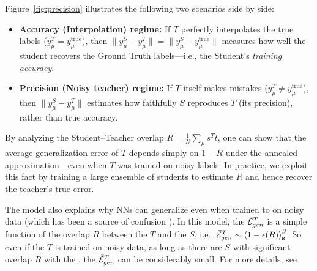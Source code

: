 

Figure~\ref{fig:precision} illustrates the following two scenarios side by side:
\begin{itemize}
  \item \textbf{Accuracy (Interpolation) regime:}
    If $T$ perfectly interpolates the true labels ($y^T_\mu = y^\text{true}_\mu$), then
    \( \|y^S_\mu - y^T_\mu\| = \|y^S_\mu - y^\text{true}_\mu\| \)
    measures how well the student recovers the Ground Truth labels—i.e., the Student's \emph{training accuracy}.

  \item \textbf{Precision (Noisy teacher) regime:}
    If $T$ itself makes mistakes ($y^T_\mu \neq y^\text{true}_\mu$), then
    \( \|y^S_\mu - y^T_\mu\| \)
    estimates how faithfully $S$ reproduces $T$ (its precision), rather than true accuracy.
\end{itemize}

By analyzing the Student–Teacher overlap $R = \tfrac1N \sum_\mu s^T t$, one can show that the average generalization error of $T$ depends simply on $1-R$ under the annealed approximation—even when $T$ was trained on noisy labels.  In practice, we exploit this fact by training a large ensemble of students to estimate $R$ and hence recover the teacher’s true error.
%

%
The \StudentTeacher model also explains why NNs can generalize even when trained to \Interpolation on noisy data (which has been a source of confusion \cite{Understanding16_TR}).  In this model, the \GeneralizationError  $\bar{\mathcal{E}}_{gen}^{T}$ is a simple function of the overlap $R$ between the \Teacher $T$ and the \Students $S$, i.e., $\bar{\mathcal{E}}_{gen}^{T}\sim \left\langle 1-\epsilon(R) \right\rangle_{\mathbf s}^{\beta}$.  So even if the \Teacher $T$ is trained on noisy data, as long as there are \Students $S$ with significant overlap $R$ with the \Teacher, the \Teacher \GeneralizationError  $\bar{\mathcal{E}}_{gen}^{T}$  can be considerably small.  For more details, see \cite{MM17_TR_v1}


